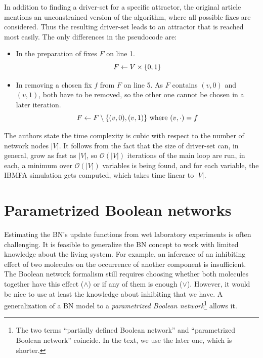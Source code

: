 \documentclass[
	digital, oneside, nosansbold, nocolorbold, nolot, nolof
]{fithesis4}
\theoremstyle{definition}
\theoremstyle{definition}
\DeclarePairedDelimiter{\set}{\{}{\}}
\begin{document}
In addition to finding a driver-set for a specific attractor, the original
article mentions an unconstrained version of the algorithm, where all possible
fixes are considered. Thus the resulting driver-set leads to an attractor that
is reached most easily. The only differences in the pseudocode are:
\begin{itemize}
    \item In the preparation of fixes $F$ on line 1.
        \[
            F \gets V \times \set{0, 1}
        \]
    \item In removing a chosen fix $f$ from $F$ on line 5. As $F$ contains
        $(v, 0)$ and $(v, 1)$, both have to be removed, so the other one
        cannot be chosen in a later iteration.
        \[
            F \gets F \setminus \set{(v, 0), (v, 1)}
                \text{ where } (v, \cdot) = f
        \]
\end{itemize}
The authors state the time complexity is cubic with respect to the number of
network nodes $|V|$. It follows from the fact that the size of driver-set can,
in general, grow as fast as $|V|$, so $\mathcal{O}(|V|)$ iterations of the main
loop are run, in each, a minimum over $\mathcal{O}(|V|)$ variables is being
found, and for each variable, the IBMFA simulation gets computed, which takes
time linear to $|V|$.


\section{Parametrized Boolean networks}

Estimating the BN's update functions from wet laboratory experiments is often
challenging. It is feasible to generalize the BN concept to work with limited
knowledge about the living system. For example, an inference of an inhibiting
effect of two molecules on the occurrence of another component is insufficient.
The Boolean network formalism still requires choosing whether both molecules
together have this effect ($\land$) or if any of them is enough ($\lor$).
However, it would be nice to use at least the knowledge about inhibiting that
we have. A generalization of a BN model to a \emph{parametrized Boolean
network}\footnote{The two terms \enquote{partially defined Boolean network} and
\enquote{parametrized Boolean network} coincide. In the text, we use the later
one, which is shorter.} allows it.
\end{document}
